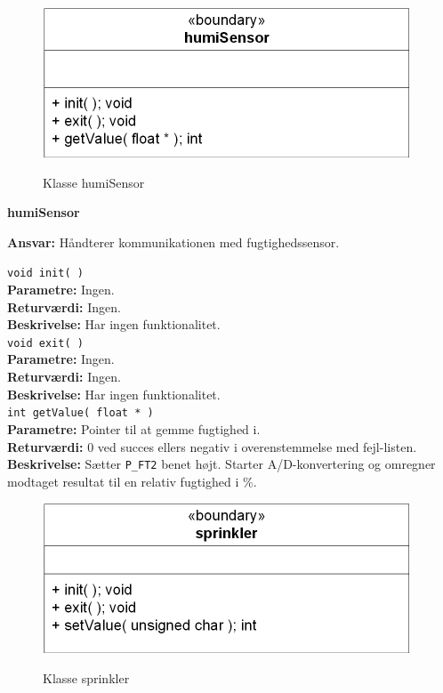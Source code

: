 \begin{figure}[htbp] \centering
{\includegraphics[scale=1.3]{filer/design/Klassediagrammer/sw_psoc_humiSensor}}
\caption{Klasse humiSensor}
\label{fig:sw_psoc_class_humiSensor}
\end{figure} 

{\centering
\textbf{humiSensor}\par
}
\textbf{Ansvar:} Håndterer kommunikationen med fugtighedssensor. \

\verb+void init( )+ \\
\textbf{Parametre:} Ingen. \\
\textbf{Returværdi:} Ingen. \\
\textbf{Beskrivelse:} Har ingen funktionalitet. \\

\verb+void exit( )+ \\
\textbf{Parametre:} Ingen. \\
\textbf{Returværdi:} Ingen. \\
\textbf{Beskrivelse:} Har ingen funktionalitet. \\

\verb+int getValue( float * )+ \\
\textbf{Parametre:} Pointer til at gemme fugtighed i. \\
\textbf{Returværdi:} 0 ved succes ellers negativ i overenstemmelse med fejl-listen. \\
\textbf{Beskrivelse:} Sætter \verb+P_FT2+ benet højt. Starter A/D-konvertering og omregner modtaget resultat til en relativ fugtighed i \%. \\

\begin{figure}[htbp] \centering
{\includegraphics[scale=1.3]{filer/design/Klassediagrammer/sw_psoc_sprinkler}}
\caption{Klasse sprinkler}
\label{fig:sw_psoc_class_sprinkler}
\end{figure} 

